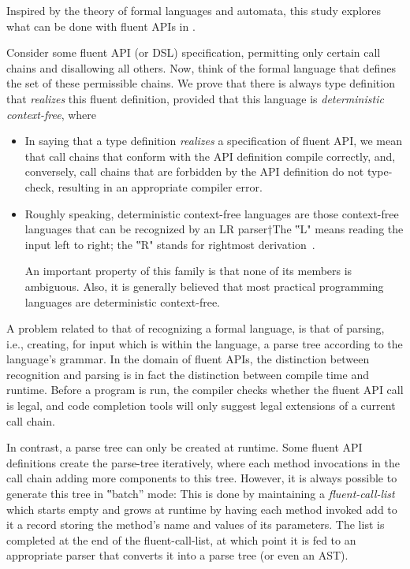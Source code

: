 Inspired by the theory of formal languages and automata,
  this study explores what can be done with fluent APIs in \Java.

Consider some fluent API (or DSL) specification, permitting only certain call
chains and disallowing all others.
Now, think of the formal language that defines the set of these permissible
chains.
We prove that there is always \Java type definition that
  \emph{realizes} this fluent definition, provided that this
  language is \emph{deterministic context-free}, where
\begin{itemize}
  \item In saying that a type definition \emph{realizes} a specification of
    fluent API, we mean that call chains that conform with the API definition
    compile correctly, and, conversely, call chains that are forbidden by the
    API definition do not type-check, resulting in an appropriate compiler
    error. \item Roughly speaking, deterministic context-free languages are
    those context-free languages that can be recognized by an LR parser†{The
      ‟L" means reading the input left to right; the ‟R" stands for rightmost
    derivation}~\cite{Aho:Sethi:Ullman:86}.
    \par
    An important property of this family is that none of its members is
    ambiguous. Also, it is generally believed that most practical programming
    languages are deterministic context-free.
\end{itemize}

A problem related to that of recognizing a formal language,
is that of parsing, i.e., creating, for input which is within the language,
  a parse tree according to the language's grammar.
In the domain of fluent APIs, the distinction between recognition and parsing
is in fact the distinction between compile time and runtime.
Before a program is run, the compiler checks whether the fluent API call is
legal, and code completion tools will only suggest legal extensions of a
current call chain.

In contrast, a parse tree can only be created at runtime.
Some fluent API definitions create the parse-tree
  iteratively, where each method invocations in the call chain adding
  more components to this tree.
However, it is always possible to generate this tree in ‟batch” mode:
This is done by maintaining a \emph{fluent-call-list} which
  starts empty and grows at runtime by having each method invoked add to it
  a record storing the method's name and values of its parameters.
The list is completed at the end of the fluent-call-list, at which point it is
fed to an appropriate parser that converts it into a parse tree (or even an
AST).

